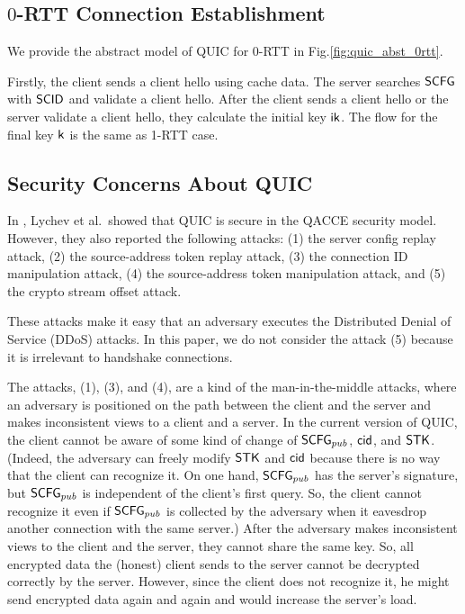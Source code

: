 \subsection{$0$-RTT Connection Establishment} \label{sec:quic_0rtt}

We provide the abstract model of QUIC for 0-RTT in
Fig.\ref{fig:quic_abst_0rtt}.

%

%
Firstly, the client sends a client hello using cache data.
The server searches $\mathsf{SCFG}$ with $\mathsf{SCID}$ and validate a
client hello.
After the client sends a client hello or the server validate
a client hello, they calculate the initial key $\mathsf{ik}$.
The flow for the final key $\mathsf{k}$ is the same as
1-RTT case.


\subsection{Security Concerns About QUIC} \label{sec:quic_detail}
In \cite{LJBN15:QUIC}, Lychev et al.~showed that QUIC is secure in the QACCE security model.
However, they also reported the following attacks:
(1) the server config replay attack,
(2) the source-address token replay attack,
(3) the connection ID manipulation attack,
(4) the source-address token manipulation attack, and
(5) the crypto stream offset attack.


These attacks make it easy that an adversary executes the Distributed Denial of Service
(DDoS) attacks.
In this paper, we do not consider the attack (5) because it is irrelevant to handshake connections.

The attacks, (1), (3), and (4), are a kind of the man-in-the-middle attacks, where
an adversary is positioned on the path between the client and the server and
makes inconsistent views to a client and a server.
In the current version of QUIC, the client cannot be aware of some kind of change of
$\mathsf{SCFG}_{pub}$, $\mathsf{cid}$, and $\mathsf{STK}$.
(Indeed, the adversary can freely modify
$\mathsf{STK}$ and $\mathsf{cid}$ because there is no way that  the client can recognize it.
On one hand, $\mathsf{SCFG}_{pub}$ has the server's signature, but
$\mathsf{SCFG}_{pub}$ is independent of the client's first query. So, the client cannot recognize it even if
$\mathsf{SCFG}_{pub}$ is collected by the adversary when it eavesdrop another connection with the same server.)
After the adversary makes inconsistent views to the client and the server,
they cannot share the same key.
So, all encrypted data the (honest) client sends to the server cannot be decrypted correctly by the server.
However, since the client does not recognize it, he might send encrypted data again and again and
would increase the server's load.

